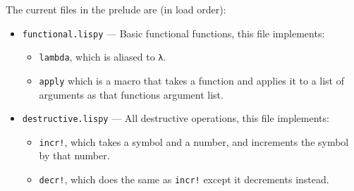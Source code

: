 \documentclass{article}
\newcommand{\code}[1]{\texttt{#1}}
\begin{document}
    The current files in the prelude are (in load order):
    \begin{itemize}
      \item \code{functional.lispy} --- Basic functional functions, this file implements:
        \begin{itemize}
          \item \code{lambda}, which is aliased to \code{λ}.
          \item \code{apply} which is a macro that takes a function
                and applies it to a list of arguments as that functions
                argument list.
        \end{itemize}
      \item \code{destructive.lispy} --- All destructive operations, this file implements:
        \begin{itemize}
          \item \code{incr!}, which takes a symbol and a number, and increments
                the symbol by that number.
          \item \code{decr!}, which does the same as \code{incr!} except it
                decrements instead.


\end{itemize}
\end{itemize}
\end{document}
